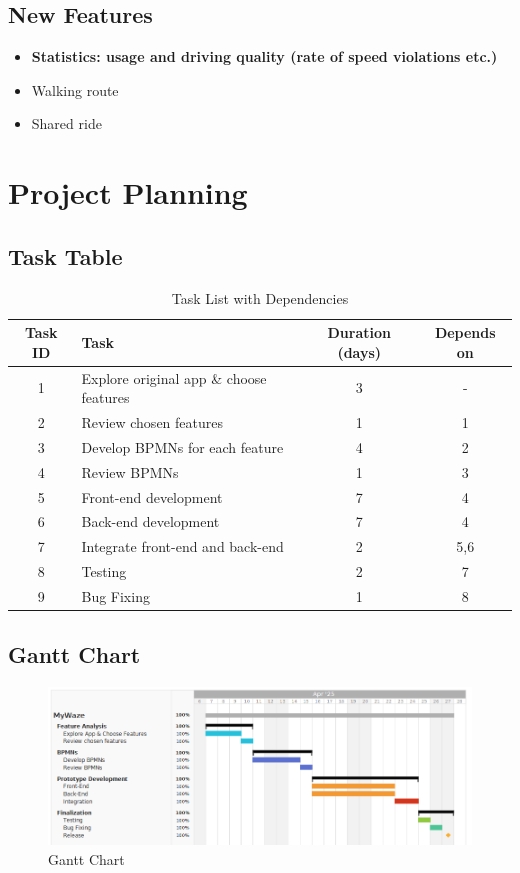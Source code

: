 \documentclass{article}
\begin{document}
\subsection*{New Features}
\begin{itemize}
    \item \textbf{Statistics: usage and driving quality (rate of speed violations etc.)}
    \item Walking route
    \item Shared ride
\end{itemize}

\section*{Project Planning}

\subsection*{Task Table}

\begin{table}[H]
  \centering
  \begin{tabular}{|c|p{6cm}|c|c|}
  \hline
  \textbf{Task ID} & \textbf{Task} & \textbf{Duration (days)} & \textbf{Depends on} \\
  \hline
  1 & Explore original app \& choose features & 3 & - \\
  2 & Review chosen features & 1 & 1 \\
  3 & Develop BPMNs for each feature & 4 & 2 \\
  4 & Review BPMNs & 1 & 3 \\
  5 & Front-end development & 7 & 4 \\
  6 & Back-end development & 7 & 4 \\
  7 & Integrate front-end and back-end & 2 & 5,6 \\
  8 & Testing & 2 & 7 \\
  9 & Bug Fixing & 1 & 8 \\
  \hline
  \end{tabular}
  \caption{Task List with Dependencies}
  \label{tab:tasklist}
\end{table}

\subsection*{Gantt Chart}

\begin{figure}[H]
  \centering
  \includegraphics[width=\textwidth]{images/gantt_chart.png}
  \caption{Gantt Chart}
  \label{fig:gantt_chart}
\end{figure}
\end{document}
